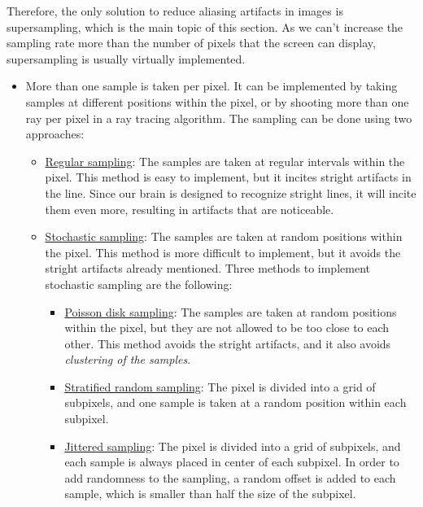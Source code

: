 Therefore, the only solution to reduce aliasing artifacts in images is supersampling, which is the main topic of this section. As we can't increase the sampling rate more than the number of pixels that the screen can display, supersampling is usually virtually implemented.
\begin{itemize}
    \item More than one sample is taken per pixel. It can be implemented by taking samples at different positions within the pixel, or by shooting more than one ray per pixel in a ray tracing algorithm. The sampling can be done using two approaches:
    \begin{itemize}
        \item \ul{Regular sampling}: The samples are taken at regular intervals within the pixel. This method is easy to implement, but it incites stright artifacts in the line. Since our brain is designed to recognize stright lines, it will incite them even more, resulting in artifacts that are noticeable.
        
        \item \ul{Stochastic sampling}: The samples are taken at random positions within the pixel. This method is more difficult to implement, but it avoids the stright artifacts already mentioned. Three methods to implement stochastic sampling are the following:
        \begin{itemize}
            \item \ul{Poisson disk sampling}: The samples are taken at random positions within the pixel, but they are not allowed to be too close to each other. This method avoids the stright artifacts, and it also avoids \emph{clustering of the samples}.
            \item \ul{Stratified random sampling}: The pixel is divided into a grid of subpixels, and one sample is taken at a random position within each subpixel.
            \item \ul{Jittered sampling}: The pixel is divided into a grid of subpixels, and each sample is always placed in center of each subpixel. In order to add randomness to the sampling, a random offset is added to each sample, which is smaller than half the size of the subpixel.
        \end{itemize}
    \end{itemize}



\end{itemize}
